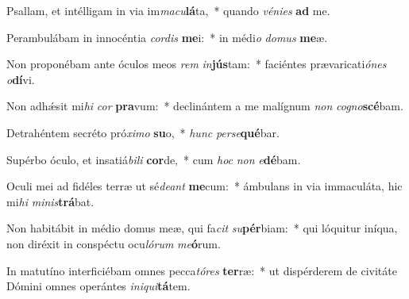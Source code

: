 \item Psallam, et intélligam in via im\textit{ma}\textit{cu}\textbf{lá}ta,~* quando \textit{vé}\textit{ni}\textit{es} \textbf{ad} me.
\item Perambulábam in innocéntia \textit{cor}\textit{dis} \textbf{me}i:~* in médi\textit{o} \textit{do}\textit{mus} \textbf{me}æ.
\item Non proponébam ante óculos meos \textit{rem} \textit{in}\textbf{jús}tam:~* faciéntes prævaricati\textit{ó}\textit{nes} \textit{o}\textbf{dí}vi.
\item Non adhǽsit mi\textit{hi} \textit{cor} \textbf{pra}vum:~* declinántem a me malígnum \textit{non} \textit{co}\textit{gno}\textbf{scé}bam.
\item Detrahéntem secréto pró\textit{xi}\textit{mo} \textbf{su}o,~* \textit{hunc} \textit{per}\textit{se}\textbf{qué}bar.
\item Supérbo óculo, et insatiá\textit{bi}\textit{li} \textbf{cor}de,~* cum \textit{hoc} \textit{non} \textit{e}\textbf{dé}bam.
\item Oculi mei ad fidéles terræ ut sé\textit{de}\textit{ant} \textbf{me}cum:~* ámbulans in via immaculáta, hic mi\textit{hi} \textit{mi}\textit{nis}\textbf{trá}bat.
\item Non habitábit in médio domus meæ, qui fa\textit{cit} \textit{su}\textbf{pér}biam:~* qui lóquitur iníqua, non diréxit in conspéctu ocu\textit{ló}\textit{rum} \textit{me}\textbf{ó}rum.
\item In matutíno interficiébam omnes pecca\textit{tó}\textit{res} \textbf{ter}ræ:~* ut dispérderem de civitáte Dómini omnes operántes \textit{in}\textit{i}\textit{qui}\textbf{tá}tem.
